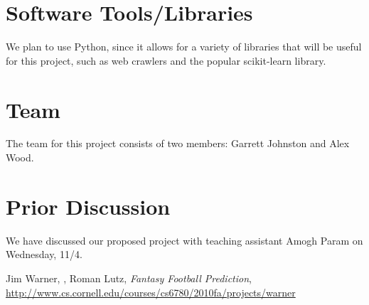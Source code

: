\documentclass[11pt,a4paper]{article}
\begin{document}
\section{Software Tools/Libraries}
We plan to use Python, since it allows for a variety of libraries that will be useful for this project, such as web crawlers and the popular scikit-learn library. 

\section{Team}
The team for this project consists of two members: Garrett Johnston and Alex Wood.

\section{Prior Discussion}
We have discussed our proposed project with teaching assistant Amogh Param on Wednesday, 11/4.

\begin{thebibliography}{1}

  Jim Warner,
  \emph{},
  Roman Lutz,
  \emph{Fantasy Football Prediction},
  \url{http://www.cs.cornell.edu/courses/cs6780/2010fa/projects/warner}
\end{thebibliography}

\end{document}
